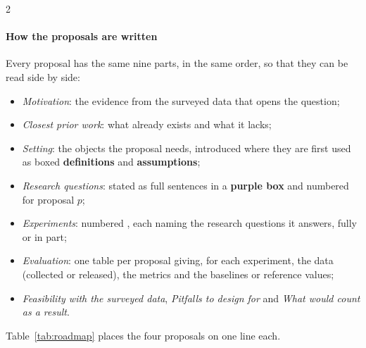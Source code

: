 \begin{multicols}{2}
\paragraph{How the proposals are written} Every proposal has the same nine parts, in the same order, so that they can be read side by side:
\begin{itemize}[leftmargin=1.1em]
\item \emph{Motivation}: the evidence from the surveyed data that opens the question;
\item \emph{Closest prior work}: what already exists and what it lacks;
\item \emph{Setting}: the objects the proposal needs, introduced where they are first used as boxed \textcolor{s1!65!black}{\textbf{definitions}} and \textcolor{warning!60!black}{\textbf{assumptions}};
\item \emph{Research questions}: stated as full sentences in a \textcolor{s7!65!black}{\textbf{purple box}} and numbered  for proposal $p$;
\item \emph{Experiments}: numbered , each naming the research questions it answers, fully or in part;
\item \emph{Evaluation}: one table per proposal giving, for each experiment, the data (collected or released), the metrics and the baselines or reference values;
\item \emph{Feasibility with the surveyed data}, \emph{Pitfalls to design for} and \emph{What would count as a result}.
\end{itemize}
Table~\ref{tab:roadmap} places the four proposals on one line each.
\end{multicols}

